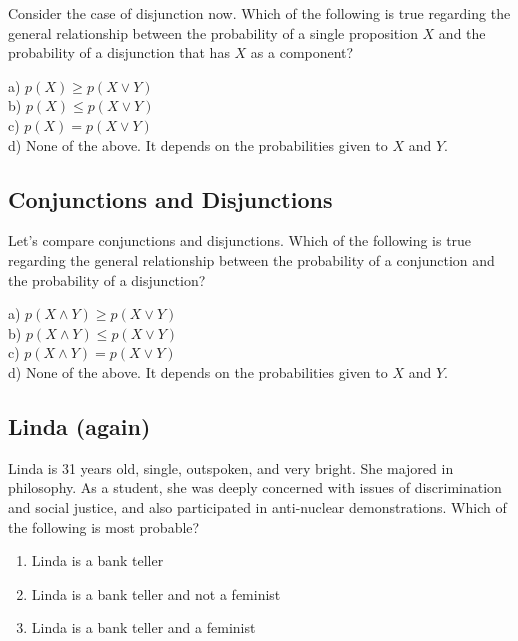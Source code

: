 \documentclass[]{tufte-book}
\providecommand{\tightlist}{%
  \setlength{\itemsep}{0pt}\setlength{\parskip}{0pt}}
\begin{document}
Consider the case of disjunction now. Which of the following is true regarding the general relationship between the probability of a single proposition \(X\) and the probability of a disjunction that has \(X\) as a component?

a) \(p(X)\geq p(X\vee Y)\)\\
\hspace*{0.333em}\hspace*{0.333em}b) \(p(X)\leq p(X\vee Y)\)\\
\hspace*{0.333em}\hspace*{0.333em}c) \(p(X) = p(X\vee Y)\)\\
\hspace*{0.333em}\hspace*{0.333em}d) None of the above. It depends on the probabilities given to \(X\) and \(Y\).

\hypertarget{conjunctions-and-disjunctions}{%
\subsection{Conjunctions and Disjunctions}\label{conjunctions-and-disjunctions}}

Let's compare conjunctions and disjunctions. Which of the following is true regarding the general relationship between the probability of a conjunction and the probability of a disjunction?

a) \(p(X\wedge Y)\geq p(X\vee Y)\)\\
b) \(p(X\wedge Y)\leq p(X\vee Y)\)\\
c) \(p(X\wedge Y) = p(X\vee Y)\)\\
d) None of the above. It depends on the probabilities given to \(X\) and \(Y\).

\hypertarget{linda-again}{%
\subsection{Linda (again)}\label{linda-again}}

Linda is 31 years old, single, outspoken, and very bright. She majored in philosophy. As a student, she was deeply concerned with issues of discrimination and social justice, and also participated in anti-nuclear demonstrations. Which of the following is most probable?

\begin{enumerate}
\def\labelenumi{\arabic{enumi}.}
\tightlist
\item
  Linda is a bank teller
\item
  Linda is a bank teller and not a feminist
\item
  Linda is a bank teller and a feminist
\end{enumerate}
\end{document}
